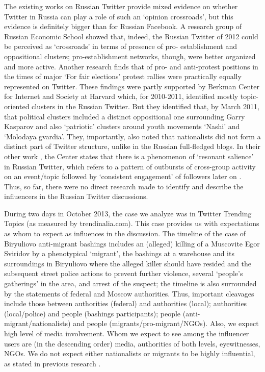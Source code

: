 The existing works on Russian Twitter provide mixed evidence on whether Twitter in Russia can play a role of such an ‘opinion crossroads’, but this evidence is definitely bigger than for Russian Facebook. A research group of Russian Economic School \cite{Greene} showed that, indeed, the Russian Twitter of 2012 could be perceived as ‘crossroads’ in terms of presence of pro- establishment and oppositional clusters; pro-establishment networks, though, were better organized and more active. Another research \cite{NikiporetsTakigawa} finds that of pro- and anti-protest positions in the times of major ‘For fair elections’ protest rallies were practically equally represented on Twitter. These findings were partly supported by Berkman Center for Internet and Society at Harvard \cite{KellyBarashAlexanyan} which, for 2010-2011, identified mostly topic-oriented clusters in the Russian Twitter. But they identified that, by March 2011, that political clusters included a distinct oppositional one surrounding Garry Kasparov and also ‘patriotic’ clusters around youth movements ‘Nashi’ and ‘Molodaya gvardia’. They, importantly, also noted that nationalists did not form a distinct part of Twitter structure, unlike in the Russian full-fledged blogs. In their other work \cite{BarashKelly}, the Center states that there is a phenomenon of ‘resonant salience’ in Russian Twitter, which refers to a pattern of outbursts of cross-group activity on an event/topic followed by ‘consistent engagement’ of followers later on \cite[p.~13]{BarashKelly}. Thus, so far, there were no direct research made to identify and describe the influencers in the Russian Twitter discussions.

During two days in October 2013, the case we analyze was in Twitter Trending Topics (as measured by trendinalia.com). This case provides us with expectations as whom to expect as influences in the discussion. The timeline of the case of Biryuliovo anti-migrant bashings includes an (alleged) killing of a Muscovite Egor Sviridov by a phenotypical ‘migrant’, the bashings at a warehouse and its surroundings in Biryuliovo where the alleged killer should have resided and the subsequent street police actions to prevent further violence, several ‘people’s gatherings’ in the area, and arrest of the suspect; the timeline is also surrounded by the statements of federal and Moscow authorities. Thus, important cleavages include those between authorities (federal) and authorities (local); authorities (local/police) and people (bashings participants); people (anti- migrant/nationalists) and people (migrants/pro-migrant/NGOs). Also, we expect high level of media involvement. Whom we expect to see among the influencer users are (in the descending order) media, authorities of both levels, eyewitnesses, NGOs. We do not expect either nationalists or migrants to be highly influential, as stated in previous research \cite{KellyBarashAlexanyan,BodrunovaLitvinenkoYakunin,BodrunovaLitvinenkoGavraYakunin,BodrunovaLitvinenko}.

